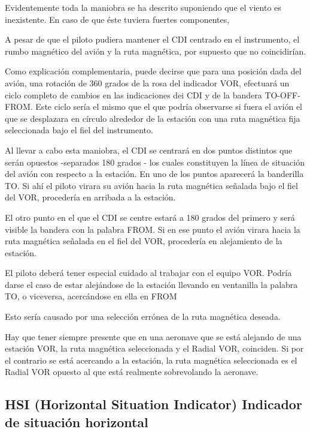Evidentemente toda la maniobra se ha descrito suponiendo que el viento es inexistente. En caso de que éste tuviera fuertes componentes,

A pesar de que el piloto pudiera mantener el CDI centrado en el instrumento, el rumbo magnético del avión y la ruta magnética, por supuesto que no coincidirían.

Como explicación complementaria, puede decirse que para una posición dada del avión, una rotación de 360 grados  de la rosa del indicador VOR, efectuará un ciclo completo de cambios en las indicaciones dei CDI y de la bandera TO-OFF-FROM. Este ciclo sería el mismo que el que podría observarse si fuera el avión el que se desplazara en círculo alrededor de la estación con una ruta magnética fija seleccionada bajo el fiel del instrumento.

Al llevar a cabo esta maniobra, el CDI se centrará en dos puntos distintos que serán opuestos -separados 180 grados  - los cuales constituyen la línea de situación del avión con respecto a la estación. En uno de los puntos aparecerá la banderilla TO. Si ahí el piloto virara su avión hacia la ruta magnética señalada bajo el fiel del VOR, procedería en arribada a la estación.

El otro punto en el que el CDI se centre estará a 180 grados del primero y  será visible la bandera con la palabra FROM. Si en ese punto el avión virara hacia la ruta magnética señalada en el fiel del VOR, procedería en alejamiento de la estación. 

El piloto deberá tener especial cuidado al trabajar con el equipo VOR. Podría darse el caso de estar alejándose de la estación llevando en ventanilla la palabra TO, o viceversa, acercándose en ella en FROM

Esto sería causado por una selección errónea de la ruta magnética deseada. 

Hay que tener siempre presente que en una aeronave que se está alejando de una estación VOR, la ruta magnética seleccionada y el Radial VOR, coinciden. Si por el contrario se está acercando a la estación, la ruta magnética seleccionada es el Radial VOR opuesto al que está realmente sobrevolando la aeronave.



\subsection{HSI (Horizontal Situation Indicator) Indicador de situación horizontal}

